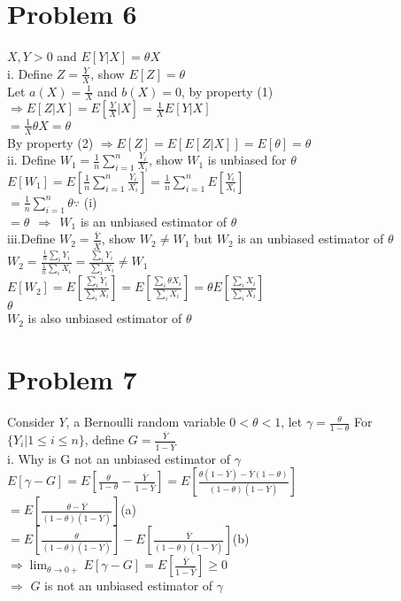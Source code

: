 \documentclass[11pt, oneside]{article}   	%
\begin{document}
\section{Problem 6}
$X,Y>0$ and $E[Y|X]=\theta X$\\

i. Define $Z=\frac{Y}{X}$, show $E[Z]=\theta$\\
Let $a(X)=\frac{1}{X}$ and $b(X)=0$, by property (1) $\Rightarrow E[Z|X]=E[\frac{Y}{X}|X]=\frac{1}{X}E[Y|X]$\\
\indent$=\frac{1}{X} \theta X=\theta$\\
\indent By property (2) $\Rightarrow E[Z]=E[E[Z|X]]=E[\theta]=\theta$\\

ii. Define $W_1=\frac{1}{n}\sum_{i=1}^{n}\frac{Y_i}{X_i}$, show $W_1$ is unbiased for $\theta$\\
$E[W_1]=E[\frac{1}{n}\sum_{i=1}^{n}\frac{Y_i}{X_i}]=\frac{1}{n}\sum_{i=1}^{n}E[\frac{Y_i}{X_i}]$\\
\indent$=\frac{1}{n}\sum_{i=1}^{n}\theta$\hfil$\because$ (i)\\
\indent$=\theta\ \ \Rightarrow\ \ W_1$ is an unbiased estimator of $\theta$\\

iii.Define $W_2=\frac{\overline{Y}}{\overline{X}}$, show $W_2 \neq W_1$ but $W_2$ is an unbiased estimator of $\theta$\\
$W_2=\frac{\frac{1}{n}\sum_i Y_i}{\frac{1}{n}\sum_i X_i}=\frac{\sum_i Y_i}{\sum_i X_i}\neq W_1$\\
$E[W_2]=E[\frac{\sum_i Y_i}{\sum_i X_i}]=E[\frac{\sum_i \theta X_i}{\sum_i X_i}]=\theta E[\frac{\sum_i X_i}{\sum_i X_i}]$\\
\indent$\theta$\\
\indent$W_2$ is also unbiased estimator of $\theta$\\

\section{Problem 7}
Consider $Y$, a Bernoulli random variable $0<\theta<1$, let $\gamma=\frac{\theta}{1-\theta}$
For $\{Y_i | 1\leq i \leq n\}$, define $G=\frac{\overline{Y}}{1-\overline{Y}}$\\

i. Why is G not an unbiased estimator of $\gamma$\\
$E[\gamma-G]=E[\frac{\theta}{1-\theta}-\frac{\overline{Y}}{1-\overline{Y}}]=E[\frac{\theta(1-\overline{Y})-\overline{Y}(1-\theta)}{(1-\theta)(1-\overline{Y})}]$\\
\indent$=E[\frac{\theta-\overline{Y}}{(1-\theta)(1-\overline{Y})}]$\hfill(a)\\
\indent$=E[\frac{\theta}{(1-\theta)(1-\overline{Y})}]-E[\frac{\overline{Y}}{(1-\theta)(1-\overline{Y})}]$\hfill(b)\\
$\Rightarrow \lim_{\theta\rightarrow 0+}E[\gamma-G]=E[\frac{\overline{Y}}{1-\overline{Y}}]\geq0$\\
\indent$\Rightarrow$ $G$ is not an unbiased estimator of $\gamma$\\
\end{document}
